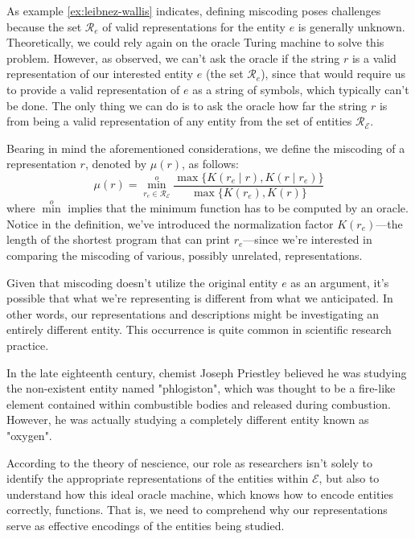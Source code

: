 As example \ref{ex:leibnez-wallis} indicates, defining miscoding poses challenges because the set $\mathcal{R}_e$ of valid representations for the entity $e$ is generally unknown. Theoretically, we could rely again on the oracle Turing machine to solve this problem. However, as observed, we can't ask the oracle if the string $r$ is a valid representation of our interested entity $e$ (the set $\mathcal{R}_e$), since that would require us to provide a valid representation of $e$ as a string of symbols, which typically can't be done. The only thing we can do is to ask the oracle how far the string $r$ is from being a valid representation of any entity from the set of entities $\mathcal{R}_\mathcal{E}$.

Bearing in mind the aforementioned considerations, we define the miscoding of a representation $r$, denoted by $\mu(r)$, as follows:
\[
\mu(r) = \overset{o}{ \underset{r_e \in \mathcal{R}_\mathcal{E}} \min} \frac{ \max\{ K(r_e \mid r), K(r \mid r_e) \} } { \max\{ K(r_e), K(r) \} }
\]
where $\overset{o} \min$ implies that the minimum function has to be computed by an oracle. Notice in the definition, we've introduced the normalization factor $K(r_e)$—the length of the shortest program that can print $r_e$—since we're interested in comparing the miscoding of various, possibly unrelated, representations.

Given that miscoding doesn't utilize the original entity $e$ as an argument, it's possible that what we're representing is different from what we anticipated. In other words, our representations and descriptions might be investigating an entirely different entity. This occurrence is quite common in scientific research practice.

\begin{example}
In the late eighteenth century, chemist Joseph Priestley believed he was studying the non-existent entity named "phlogiston", which was thought to be a fire-like element contained within combustible bodies and released during combustion. However, he was actually studying a completely different entity known as "oxygen".
\end{example}

According to the theory of nescience, our role as researchers isn't solely to identify the appropriate representations of the entities within $\mathcal{E}$, but also to understand how this ideal oracle machine, which knows how to encode entities correctly, functions. That is, we need to comprehend why our representations serve as effective encodings of the entities being studied.

